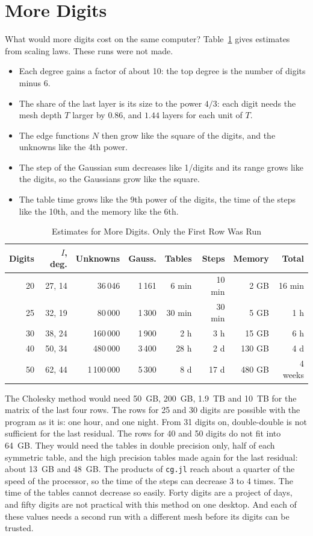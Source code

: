 \documentclass[journal]{IEEEtran}
\begin{document}
\section{More Digits}
What would more digits cost on the same computer? Table~\ref{tab:digits} gives estimates from scaling laws. These runs were not made.
\begin{itemize}
\item Each degree gains a factor of about 10: the top degree is the number of digits minus 6.
\item The share of the last layer is its size to the power $4/3$: each digit needs the mesh depth $T$ larger by $0.86$, and $1.44$ layers for each unit of $T$.
\item The edge functions $N$ then grow like the square of the digits, and the unknowns like the 4th power.
\item The step of the Gaussian sum decreases like 1/digits and its range grows like the digits, so the Gaussians grow like the square.
\item The table time grows like the 9th power of the digits, the time of the steps like the 10th, and the memory like the 6th.
\end{itemize}

\begin{table}[!t]
\caption{Estimates for More Digits. Only the First Row Was Run}
\label{tab:digits}
\centering
\footnotesize
\setlength{\tabcolsep}{2.5pt}
\begin{tabular}{rrrrrrrr}
\toprule
Digits & $I$, deg. & Unknowns & Gauss. & Tables & Steps & Memory & Total\\
\midrule
20 & 27, 14 & 36\,046 & 1\,161 & 6 min & 10 min & 2 GB & 16 min\\
25 & 32, 19 & 80\,000 & 1\,300 & 30 min & 30 min & 5 GB & 1 h\\
30 & 38, 24 & 160\,000 & 1\,900 & 2 h & 3 h & 15 GB & 6 h\\
40 & 50, 34 & 480\,000 & 3\,400 & 28 h & 2 d & 130 GB & 4 d\\
50 & 62, 44 & 1\,100\,000 & 5\,300 & 8 d & 17 d & 480 GB & 4 weeks\\
\bottomrule
\end{tabular}
\end{table}

The Cholesky method would need 50~GB, 200~GB, 1.9~TB and 10~TB for the matrix of the last four rows. The rows for 25 and 30 digits are possible with the program as it is: one hour, and one night. From 31 digits on, double-double is not sufficient for the last residual. The rows for 40 and 50 digits do not fit into 64~GB. They would need the tables in double precision only, half of each symmetric table, and the high precision tables made again for the last residual: about 13~GB and 48~GB. The products of \texttt{cg.jl} reach about a quarter of the speed of the processor, so the time of the steps can decrease 3 to 4 times. The time of the tables cannot decrease so easily. Forty digits are a project of days, and fifty digits are not practical with this method on one desktop. And each of these values needs a second run with a different mesh before its digits can be trusted.
\end{document}
